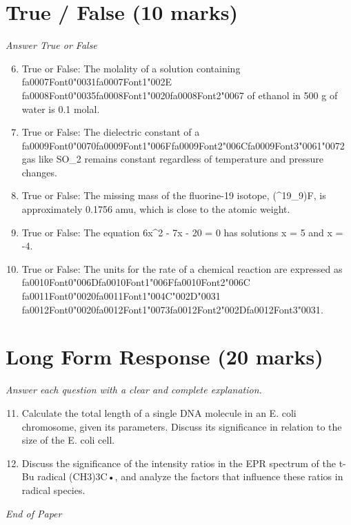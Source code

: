 \documentclass[12pt]{article}
\begin{document}
\section*{True / False (10 marks)}
\textit{Answer True or False}
\begin{enumerate}[label=\arabic*.]
\setcounter{enumi}{5}
\item True or False: The molality of a solution containing {\csname fa0007Font0\endcsname\char"0031}{\csname fa0007Font1\endcsname\char"002E} {\csname fa0008Font0\endcsname\char"0035}{\csname fa0008Font1\endcsname\char"0020}{\csname fa0008Font2\endcsname\char"0067} of ethanol in 500 g of water is 0.1 molal.
\item True or False: The dielectric constant of a {\csname fa0009Font0\endcsname\char"0070}{\csname fa0009Font1\endcsname\char"006F}{\csname fa0009Font2\endcsname\char"006C}{\csname fa0009Font3\endcsname\char"0061}{\char"0072} gas like SO\_2 remains constant regardless of temperature and pressure changes.
\item True or False: The missing mass of the fluorine-19 isotope, (\^{}19\_9)F, is approximately 0.1756 amu, which is close to the atomic weight.
\item True or False: The equation 6x\^{}2 - 7x - 20 = 0 has solutions x = 5 and x = -4.
\item True or False: The units for the rate of a chemical reaction are expressed as {\csname fa0010Font0\endcsname\char"006D}{\csname fa0010Font1\endcsname\char"006F}{\csname fa0010Font2\endcsname\char"006C} {\csname fa0011Font0\endcsname\char"0020}{\csname fa0011Font1\endcsname\char"004C}{\char"002D}{\char"0031} {\csname fa0012Font0\endcsname\char"0020}{\csname fa0012Font1\endcsname\char"0073}{\csname fa0012Font2\endcsname\char"002D}{\csname fa0012Font3\endcsname\char"0031}.
\end{enumerate}

\section*{Long Form Response (20 marks)}
\textit{Answer each question with a clear and complete explanation.}
\begin{enumerate}[label=\arabic*.]
\setcounter{enumi}{10}
\item Calculate the total length of a single DNA molecule in an E. coli chromosome, given its
parameters. Discuss its significance in relation to the size of the E. coli cell.
\item Discuss the significance of the intensity ratios in the EPR spectrum of the t-Bu radical
(CH3)3C•, and analyze the factors that influence these ratios in radical species.
\end{enumerate}

\vfill
\noindent\textit{End of Paper}
\end{document}

